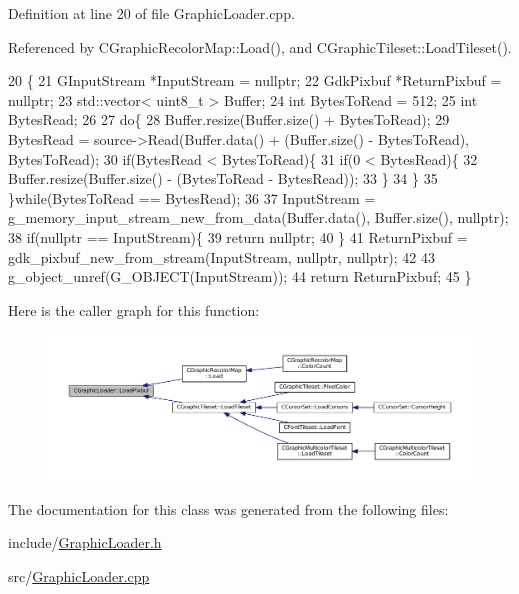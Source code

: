 Definition at line 20 of file Graphic\+Loader.\+cpp.



Referenced by C\+Graphic\+Recolor\+Map\+::\+Load(), and C\+Graphic\+Tileset\+::\+Load\+Tileset().


\begin{DoxyCode}
20                                                                         \{
21     GInputStream *InputStream = \textcolor{keyword}{nullptr};
22     GdkPixbuf *ReturnPixbuf = \textcolor{keyword}{nullptr};
23     std::vector< uint8\_t > Buffer;
24     \textcolor{keywordtype}{int} BytesToRead = 512;
25     \textcolor{keywordtype}{int} BytesRead;
26     
27     \textcolor{keywordflow}{do}\{
28         Buffer.resize(Buffer.size() + BytesToRead);
29         BytesRead = source->Read(Buffer.data() + (Buffer.size() - BytesToRead), BytesToRead);
30         \textcolor{keywordflow}{if}(BytesRead < BytesToRead)\{
31             \textcolor{keywordflow}{if}(0 < BytesRead)\{
32                 Buffer.resize(Buffer.size() - (BytesToRead - BytesRead));
33             \}
34         \}
35     \}\textcolor{keywordflow}{while}(BytesToRead == BytesRead);
36     
37     InputStream = g\_memory\_input\_stream\_new\_from\_data(Buffer.data(), Buffer.size(), \textcolor{keyword}{nullptr});
38     \textcolor{keywordflow}{if}(\textcolor{keyword}{nullptr} == InputStream)\{
39         \textcolor{keywordflow}{return} \textcolor{keyword}{nullptr};   
40     \}
41     ReturnPixbuf = gdk\_pixbuf\_new\_from\_stream(InputStream, \textcolor{keyword}{nullptr}, \textcolor{keyword}{nullptr}); 
42     
43     g\_object\_unref(G\_OBJECT(InputStream));
44     \textcolor{keywordflow}{return} ReturnPixbuf;
45 \}
\end{DoxyCode}
Here is the caller graph for this function\+:\nopagebreak
\begin{figure}[H]
\begin{center}
\leavevmode
\includegraphics[width=350pt]{classCGraphicLoader_ac7778dec4fd0ea51674f0b23f3029edf_icgraph}
\end{center}
\end{figure}


The documentation for this class was generated from the following files\+:\begin{DoxyCompactItemize}
\item 
include/\hyperlink{GraphicLoader_8h}{Graphic\+Loader.\+h}\item 
src/\hyperlink{GraphicLoader_8cpp}{Graphic\+Loader.\+cpp}\end{DoxyCompactItemize}
